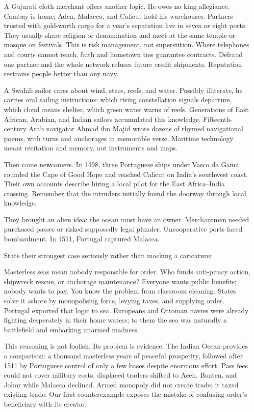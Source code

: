 A Gujarati cloth merchant offers another logic. He owes no king allegiance. Cambay is home; Aden, Malacca, and Calicut hold his warehouses. Partners trusted with gold-worth cargo for a year's separation live in seven or eight ports. They usually share religion or denomination and meet at the same temple or mosque on festivals. This is risk management, not superstition. Where telephones and courts cannot reach, faith and hometown ties guarantee contracts. Defraud one partner and the whole network refuses future credit shipments. Reputation restrains people better than any navy.

A Swahili sailor cares about wind, stars, reefs, and water. Possibly illiterate, he carries oral sailing instructions: which rising constellation signals departure, which cloud means shelter, which green water warns of reefs. Generations of East African, Arabian, and Indian sailors accumulated this knowledge. Fifteenth-century Arab navigator Ahmad ibn Majid wrote dozens of rhymed navigational poems, with turns and anchorages in memorable verse. Maritime technology meant recitation and memory, not instruments and maps.

Then came newcomers. In 1498, three Portuguese ships under Vasco da Gama rounded the Cape of Good Hope and reached Calicut on India's southwest coast. Their own accounts describe hiring a local pilot for the East Africa--India crossing. Remember that the intruders initially found the doorway through local knowledge.

They brought an alien idea: the ocean must have an owner. Merchantmen needed purchased passes or risked supposedly legal plunder. Uncooperative ports faced bombardment. In 1511, Portugal captured Malacca.

State their strongest case seriously rather than mocking a caricature:

Masterless seas mean nobody responsible for order. Who funds anti-piracy action, shipwreck rescue, or anchorage maintenance? Everyone wants public benefits; nobody wants to pay. You know the problem from classroom cleaning. States solve it ashore by monopolising force, levying taxes, and supplying order. Portugal exported that logic to sea. Europeans and Ottoman navies were already fighting desperately in their home waters; to them the sea was naturally a battlefield and embarking unarmed madness.

This reasoning is not foolish. Its problem is evidence. The Indian Ocean provides a comparison: a thousand masterless years of peaceful prosperity, followed after 1511 by Portuguese control of only a few bases despite enormous effort. Pass fees could not cover military costs; displaced traders shifted to Aceh, Banten, and Johor while Malacca declined. Armed monopoly did not create trade; it taxed existing trade. Our first counterexample exposes the mistake of confusing order's beneficiary with its creator.

